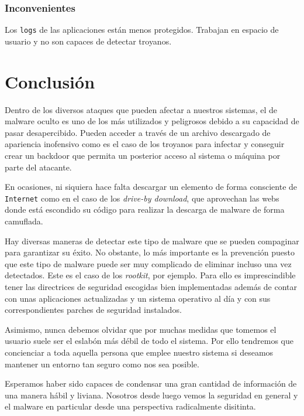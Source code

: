 \documentclass[12pt]{article}
\newcommand{\newpar} {
    \vskip 0.5cm
}
\begin{document}
            \subsubsection{Inconvenientes}
                Los \texttt{logs} de las aplicaciones están menos protegidos. Trabajan en espacio de usuario y no son capaces de detectar troyanos.

    \section{Conclusión}
        Dentro de los diversos ataques que pueden afectar a nuestros sistemas, el de malware oculto es uno de los más utilizados y peligrosos debido a su capacidad de pasar desapercibido. Pueden acceder a través de un archivo descargado de apariencia inofensivo como es el caso de los troyanos para infectar y conseguir crear un backdoor que permita un posterior acceso al sistema o máquina por parte del atacante.

        \newpar

        En ocasiones, ni siquiera hace falta descargar un elemento de forma consciente de \texttt{Internet} como en el caso de los \textit{drive-by download}, que aprovechan las webs donde está escondido su código para realizar la descarga de malware de forma camuflada.

        \newpar

        Hay diversas maneras de detectar este tipo de malware que se pueden compaginar para garantizar su éxito. No obstante, lo más importante es la prevención puesto que este tipo de malware puede ser muy complicado de eliminar incluso una vez detectados. Este es el caso de los \textit{rootkit}, por ejemplo. Para ello es imprescindible tener las directrices de seguridad escogidas bien implementadas además de contar con unas aplicaciones actualizadas y un sistema operativo al día y con sus correspondientes parches de seguridad instalados.

        \newpar

        Asimismo, nunca debemos olvidar que por muchas medidas que tomemos el usuario suele ser el eslabón más débil de todo el sistema. Por ello tendremos que concienciar a toda aquella persona que emplee nuestro sistema si deseamos mantener un entorno tan seguro como nos sea posible.

        \newpar

        Esperamos haber sido capaces de condensar una gran cantidad de información de una manera hábil y liviana. Nosotros desde luego vemos la seguridad en general y el malware en particular desde una perspectiva radicalmente disitinta.

    \newpage

    \nocite{*}
    
    {}
\end{document}
